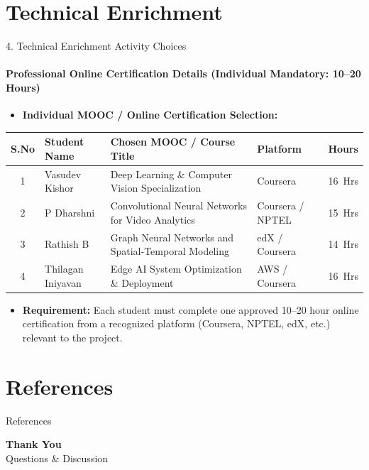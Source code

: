 \documentclass[aspectratio=169, 11pt]{beamer}
\begin{document}
\section{Technical Enrichment}
\begin{frame}{4. Technical Enrichment Activity Choices}
    \framesubtitle{Professional Online Certification Details (Individual Mandatory: 10--20 Hours)}
    \begin{itemize}
        \item \textbf{Individual MOOC / Online Certification Selection:}
    \end{itemize}
    \vspace{-0.1cm}
    \begin{table}
        \centering
        \footnotesize
        \renewcommand{\arraystretch}{1.15}
        \begin{tabular}{|c|p{2.8cm}|p{5.0cm}|p{2.3cm}|c|}
            \hline
            \textbf{S.No} & \textbf{Student Name} & \textbf{Chosen MOOC / Course Title} & \textbf{Platform} & \textbf{Hours} \\
            \hline
            1 & Vasudev Kishor & Deep Learning \& Computer Vision Specialization & Coursera & 16~Hrs \\
            \hline
            2 & P Dharshni & Convolutional Neural Networks for Video Analytics & Coursera / NPTEL & 15~Hrs \\
            \hline
            3 & Rathish B & Graph Neural Networks and Spatial-Temporal Modeling & edX / Coursera & 14~Hrs \\
            \hline
            4 & Thilagan Iniyavan & Edge AI System Optimization \& Deployment & AWS / Coursera & 16~Hrs \\
            \hline
        \end{tabular}
    \end{table}
    \vspace{0.15cm}
    \begin{itemize}
        \item {\scriptsize \textbf{Requirement:} Each student must complete one approved 10--20 hour online certification from a recognized platform (Coursera, NPTEL, edX, etc.) relevant to the project.}
    \end{itemize}
\end{frame}

\section{References}
\begin{frame}[allowframebreaks]{References}
    
     
\end{frame}

\begin{frame}
    \centering    
    {\Huge \textbf{\textcolor{amritaMaroon}{Thank You}}} \\
    \vspace{0.4cm}
    {\large Questions \& Discussion}
\end{frame}
\end{document}

